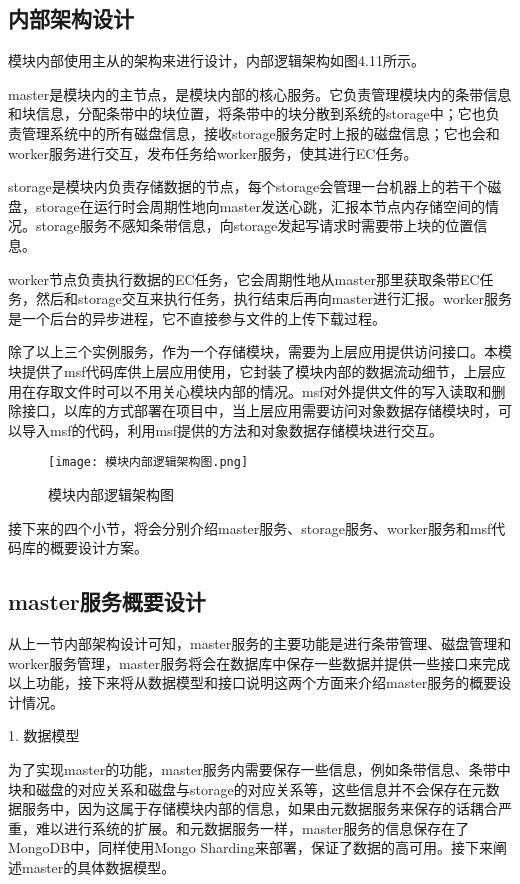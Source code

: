 \subsection{内部架构设计}%
模块内部使用主从的架构来进行设计，内部逻辑架构如图4.11所示。

master是模块内的主节点，是模块内部的核心服务。它负责管理模块内的条带信息和块信息，分配条带中的块位置，将条带中的块分散到系统的storage中；它也负责管理系统中的所有磁盘信息，接收storage服务定时上报的磁盘信息；它也会和worker服务进行交互，发布任务给worker服务，使其进行EC任务。

storage是模块内负责存储数据的节点，每个storage会管理一台机器上的若干个磁盘，storage在运行时会周期性地向master发送心跳，汇报本节点内存储空间的情况。storage服务不感知条带信息，向storage发起写请求时需要带上块的位置信息。

worker节点负责执行数据的EC任务，它会周期性地从master那里获取条带EC任务，然后和storage交互来执行任务，执行结束后再向master进行汇报。worker服务是一个后台的异步进程，它不直接参与文件的上传下载过程。

除了以上三个实例服务，作为一个存储模块，需要为上层应用提供访问接口。本模块提供了msf代码库供上层应用使用，它封装了模块内部的数据流动细节，上层应用在存取文件时可以不用关心模块内部的情况。msf对外提供文件的写入读取和删除接口，以库的方式部署在项目中，当上层应用需要访问对象数据存储模块时，可以导入msf的代码，利用msf提供的方法和对象数据存储模块进行交互。

\begin{figure}[h]
  \centering
  \texttt{[image: 模块内部逻辑架构图.png]}
  \caption{模块内部逻辑架构图}
\end{figure}

接下来的四个小节，将会分别介绍master服务、storage服务、worker服务和msf代码库的概要设计方案。

\subsection{master服务概要设计}

从上一节内部架构设计可知，master服务的主要功能是进行条带管理、磁盘管理和worker服务管理，master服务将会在数据库中保存一些数据并提供一些接口来完成以上功能，接下来将从数据模型和接口说明这两个方面来介绍master服务的概要设计情况。

1. 数据模型

为了实现master的功能，master服务内需要保存一些信息，例如条带信息、条带中块和磁盘的对应关系和磁盘与storage的对应关系等，这些信息并不会保存在元数据服务中，因为这属于存储模块内部的信息，如果由元数据服务来保存的话耦合严重，难以进行系统的扩展。和元数据服务一样，master服务的信息保存在了MongoDB中，同样使用Mongo Sharding来部署，保证了数据的高可用。接下来阐述master的具体数据模型。

